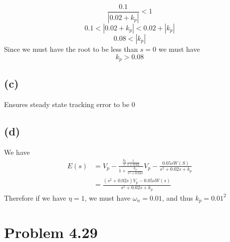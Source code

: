 \documentclass[12pt]{article}
\begin{document}
$$\frac{0.1}{|0.02+k_p|}<1$$
$$0.1<|0.02+k_p|<0.02+|k_p|$$
$$0.08<|k_p|$$
Since we must have the root to be less than $s=0$ we must have
$$\boxed{k_p>0.08}$$
\subsection*{(c)}
Ensures steady state tracking error to be $0$
\subsection*{(d)}
We have
\begin{align*}
    E(s)&=V_p-\frac{\frac{k_p}{s}\frac{1}{s+0.02}}{1+\frac{k_p}{s^2+0.02s}}
V_p-\frac{0.05sW(S)}{s^2+0.02s+k_p}\\
&=\frac{(s^2+0.02s)V_p-0.05sW(s)}{s^2+0.02s+k_p}
\end{align*}
Therefore if we have $\eta=1$, we must have $\omega_n=0.01$, and thus $\boxed{k_p=0.01^2}$
\section*{Problem 4.29}
\subsection*{}
\end{document}
